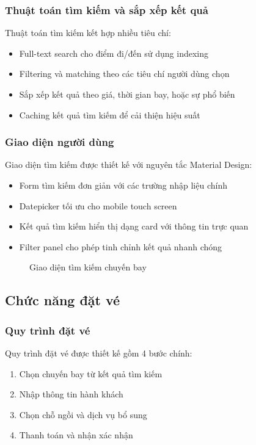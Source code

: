 \subsubsection{Thuật toán tìm kiếm và sắp xếp kết quả}
Thuật toán tìm kiếm kết hợp nhiều tiêu chí:

\begin{itemize}[leftmargin=1cm]
    \item Full-text search cho điểm đi/đến sử dụng indexing
    \item Filtering và matching theo các tiêu chí người dùng chọn
    \item Sắp xếp kết quả theo giá, thời gian bay, hoặc sự phổ biến
    \item Caching kết quả tìm kiếm để cải thiện hiệu suất
\end{itemize}

\subsubsection{Giao diện người dùng}
Giao diện tìm kiếm được thiết kế với nguyên tắc Material Design:

\begin{itemize}[leftmargin=1cm]
    \item Form tìm kiếm đơn giản với các trường nhập liệu chính
    \item Datepicker tối ưu cho mobile touch screen
    \item Kết quả tìm kiếm hiển thị dạng card với thông tin trực quan
    \item Filter panel cho phép tinh chỉnh kết quả nhanh chóng
\end{itemize}

\begin{figure}[H]
\centering
\caption{Giao diện tìm kiếm chuyến bay}
\end{figure}

\subsection{Chức năng đặt vé}

\subsubsection{Quy trình đặt vé}
Quy trình đặt vé được thiết kế gồm 4 bước chính:

\begin{enumerate}
    \item Chọn chuyến bay từ kết quả tìm kiếm
    \item Nhập thông tin hành khách
    \item Chọn chỗ ngồi và dịch vụ bổ sung
    \item Thanh toán và nhận xác nhận
\end{enumerate}

